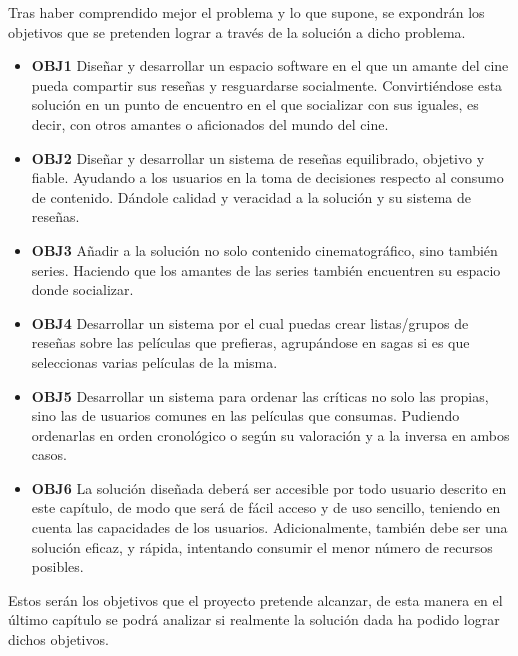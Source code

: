Tras haber comprendido mejor el problema y lo que supone, se expondrán los objetivos que se pretenden 
lograr a través de la solución a dicho problema.

\begin{itemize}
    \item \textbf{OBJ1} Diseñar y desarrollar un espacio software en el que un amante del cine pueda compartir sus reseñas y resguardarse socialmente. Convirtiéndose esta solución en un punto de encuentro en el que socializar con sus iguales, es decir, con otros amantes o aficionados del mundo del cine.
    \item \textbf{OBJ2} Diseñar y desarrollar un sistema de reseñas equilibrado, objetivo y fiable. Ayudando a los usuarios en la toma de decisiones respecto al consumo de contenido. Dándole calidad y veracidad a la solución y su sistema de reseñas.
    \item \textbf{OBJ3} Añadir a la solución no solo contenido cinematográfico, sino también series. Haciendo que los amantes de las series también encuentren su espacio donde socializar.
    \item \textbf{OBJ4} Desarrollar un sistema por el cual puedas crear listas/grupos de reseñas sobre las películas que prefieras, agrupándose en sagas si es que seleccionas varias películas de la misma.
    \item \textbf{OBJ5} Desarrollar un sistema para ordenar las críticas no solo las propias, sino las de usuarios comunes en las películas que consumas. Pudiendo ordenarlas en orden cronológico o según su valoración y a la inversa en ambos casos.
    \item \textbf{OBJ6} La solución diseñada deberá ser accesible por todo usuario descrito en este capítulo, de modo que será de fácil acceso y de uso sencillo, teniendo en cuenta las capacidades de los usuarios. Adicionalmente, también debe ser una solución eficaz, y rápida, intentando consumir el menor número de recursos posibles.
\end{itemize}

Estos serán los objetivos que el proyecto pretende alcanzar, de esta manera en el último capítulo se 
podrá analizar si realmente la solución dada ha podido lograr dichos objetivos.
